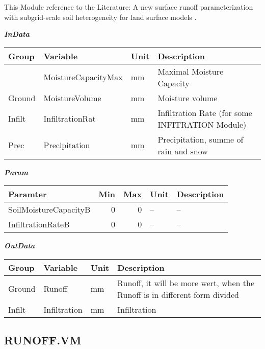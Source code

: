 \documentclass[
]{book}
\begin{document}
This Module reference to the Literature: A new surface runoff parameterization with subgrid-scale soil heterogeneity for land surface models \citep{Liang.2001}.

\textbf{\emph{InData}}

\begin{table}[!h]
\centering
\begin{tabular}{l|l|l|l}
\hline
Group & Variable & Unit & Description\\
\hline
 & MoistureCapacityMax & mm & Maximal Moisture Capacity\\
\cline{2-4}
\multirow{-2}{*}{\raggedright\arraybackslash Ground} & MoistureVolume & mm & Moisture volume\\
\cline{1-4}
Infilt & InfiltrationRat & mm & Infiltration Rate (for some INFITRATION Module)\\
\cline{1-4}
Prec & Precipitation & mm & Precipitation, summe of rain and snow\\
\hline
\end{tabular}
\end{table}

\textbf{\emph{Param}}

\begin{table}[!h]
\centering
\begin{tabular}{l|r|r|l|l}
\hline
Paramter & Min & Max & Unit & Description\\
\hline
SoilMoistureCapacityB & 0 & 0 & -- & --\\
\cline{1-5}
InfiltrationRateB & 0 & 0 & -- & --\\
\hline
\end{tabular}
\end{table}

\textbf{\emph{OutData}}

\begin{table}[!h]
\centering
\begin{tabular}{l|l|l|l}
\hline
Group & Variable & Unit & Description\\
\hline
Ground & Runoff & mm & Runoff, it will be more wert, when the Runoff is in different form divided\\
\cline{1-4}
Infilt & Infiltration & mm & Infiltration\\
\hline
\end{tabular}
\end{table}

\hypertarget{runoff.vm}{%
\subsection{RUNOFF.VM}\label{runoff.vm}}
\end{document}
